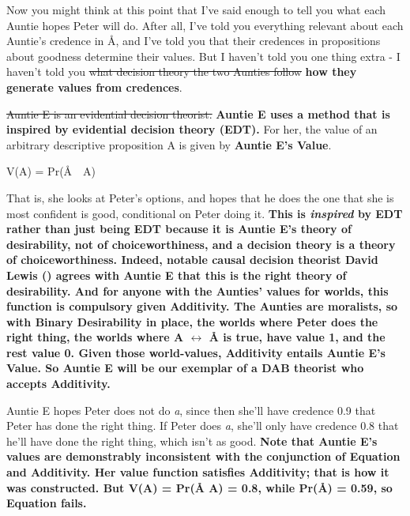 \documentclass[
  11pt,
  letterpaper,
  DIV=11,
  numbers=noendperiod,
  twoside]{scrartcl}
\providecommand{\tightlist}{%
  \setlength{\itemsep}{0pt}\setlength{\parskip}{0pt}}
\begin{document}
Now you might think at this point that I've said enough to tell you what
each Auntie hopes Peter will do. After all, I've told you everything
relevant about each Auntie's credence in Å, and I've told you that their
credences in propositions about goodness determine their values. But I
haven't told you one thing extra - I haven't told you \sout{what
decision theory the two Aunties follow} {\bfseries\boldmath{}how they
generate values from credences}.

\sout{Auntie E is an evidential decision theorist.}
{\bfseries\boldmath{}Auntie E uses a method that is inspired by
evidential decision theory (EDT).} For her, the value of an arbitrary
descriptive proposition A is given by \textbf{Auntie E's Value}.

\begin{description}
\tightlist
\item[Auntie E's Value]
V(A) = Pr(Å~\textbar~A)
\end{description}

That is, she looks at Peter's options, and hopes that he does the one
that she is most confident is good, conditional on Peter doing it.
{\bfseries\boldmath{}This is \emph{inspired} by EDT rather than just
being EDT because it is Auntie E's theory of desirability, not of
choiceworthiness, and a decision theory is a theory of choiceworthiness.
Indeed, notable causal decision theorist David Lewis
() agrees with Auntie E that this is the
right theory of desirability. And for anyone with the Aunties' values
for worlds, this function is compulsory given \textbf{Additivity}. The
Aunties are moralists, so with \textbf{Binary Desirability} in place,
the worlds where Peter does the right thing, the worlds where A
\(\leftrightarrow\) Å is true, have value 1, and the rest value 0. Given
those world-values, \textbf{Additivity} entails \textbf{Auntie E's
Value}. So Auntie E will be our exemplar of a DAB theorist who accepts
\textbf{Additivity}.}

Auntie E hopes Peter does not do \emph{a}, since then she'll have
credence 0.9 that Peter has done the right thing. If Peter does
\emph{a}, she'll only have credence 0.8 that he'll have done the right
thing, which isn't as good. {\bfseries\boldmath{}Note that Auntie E's
values are demonstrably inconsistent with the conjunction of
\textbf{Equation} and \textbf{Additivity}. Her value function satisfies
\textbf{Additivity}; that is how it was constructed. But V(A) = Pr(Å
\textbar{} A) = 0.8, while Pr(Å) = 0.59, so \textbf{Equation} fails.}
\end{document}
